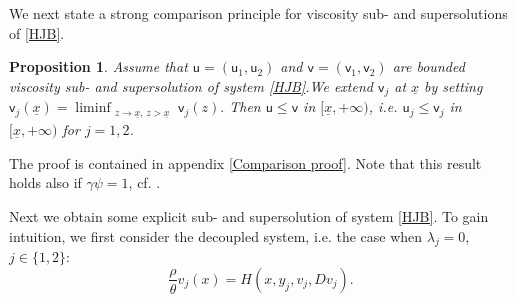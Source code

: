 \documentclass[11pt]{article}
\numberwithin{equation}{section}
\newtheorem{prop}[thm]{Proposition}
\theoremstyle{definition}
\newcommand{\ux}{{\underline x}}
\newcommand{\ld}{\lambda}
\newcommand{\g}{\gamma}
\newcommand{\p}{\psi}
\theoremstyle{plain}
\begin{document}
We next state a strong comparison principle for viscosity sub- and supersolutions of \eqref{HJB}.
\begin{prop}\label{comparison}
Assume that $\mathsf{u}=(\mathsf{u}_1,\mathsf{u}_2)$ and $\mathsf{v}=(\mathsf{v}_1,\mathsf{v}_2)$ are bounded viscosity sub- and supersolution of system \eqref{HJB}.We extend $\mathsf{v}_j$ at $\ux$ by setting 
$
\mathsf{v}_j(\ux)=\liminf_{\substack{z\rightarrow \ux,\, z>\ux}} \mathsf{v}_j(z) .
$
Then $\mathsf{u}\leq \mathsf{v}$ in $[\ux,+\infty)$, i.e. $\mathsf{u}_j\le \mathsf{v}_j$ in $[\ux,+\infty)$ for $j=1,2$.
\end{prop}

The proof is contained in appendix \ref{Comparison proof}. Note that this result holds also if $\g \p=1$, cf. \cite{camilli2025semi}.\par
Next we obtain some explicit sub- and supersolution of system \eqref{HJB}. To gain intuition, we first consider the decoupled system, i.e. the case when $\ld_j=0$, $j\in \{1,2\}$:
\begin{equation}\label{eq:HJB1d}
\frac{\rho}{\theta} v_j(x) = H(x, y_j, v_j,Dv_j).
\end{equation}
\end{document}

